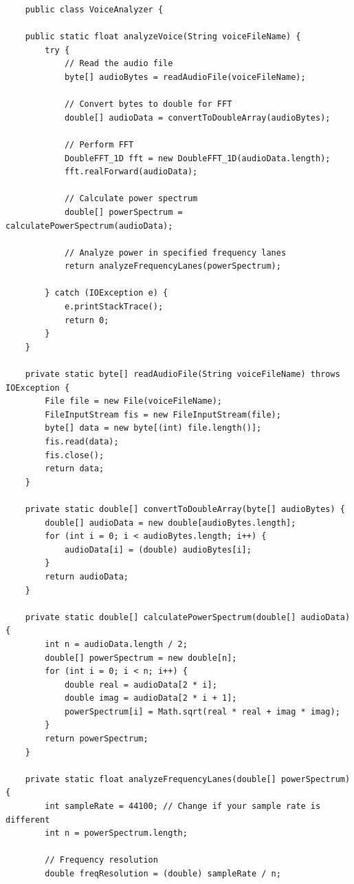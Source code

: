 \documentclass[12pt,a4paper]{article}
\begin{document}
\vspace{5mm}

\begin{lstlisting}
    public class VoiceAnalyzer {

    public static float analyzeVoice(String voiceFileName) {
        try {
            // Read the audio file
            byte[] audioBytes = readAudioFile(voiceFileName);

            // Convert bytes to double for FFT
            double[] audioData = convertToDoubleArray(audioBytes);

            // Perform FFT
            DoubleFFT_1D fft = new DoubleFFT_1D(audioData.length);
            fft.realForward(audioData);

            // Calculate power spectrum
            double[] powerSpectrum = calculatePowerSpectrum(audioData);

            // Analyze power in specified frequency lanes
            return analyzeFrequencyLanes(powerSpectrum);

        } catch (IOException e) {
            e.printStackTrace();
            return 0;
        }
    }

    private static byte[] readAudioFile(String voiceFileName) throws IOException {
        File file = new File(voiceFileName);
        FileInputStream fis = new FileInputStream(file);
        byte[] data = new byte[(int) file.length()];
        fis.read(data);
        fis.close();
        return data;
    }

    private static double[] convertToDoubleArray(byte[] audioBytes) {
        double[] audioData = new double[audioBytes.length];
        for (int i = 0; i < audioBytes.length; i++) {
            audioData[i] = (double) audioBytes[i];
        }
        return audioData;
    }

    private static double[] calculatePowerSpectrum(double[] audioData) {
        int n = audioData.length / 2;
        double[] powerSpectrum = new double[n];
        for (int i = 0; i < n; i++) {
            double real = audioData[2 * i];
            double imag = audioData[2 * i + 1];
            powerSpectrum[i] = Math.sqrt(real * real + imag * imag);
        }
        return powerSpectrum;
    }

    private static float analyzeFrequencyLanes(double[] powerSpectrum) {
        int sampleRate = 44100; // Change if your sample rate is different
        int n = powerSpectrum.length;

        // Frequency resolution
        double freqResolution = (double) sampleRate / n;


\end{lstlisting}
\end{document}
